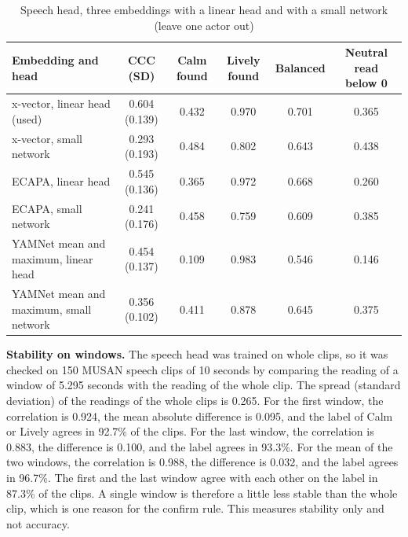 \begin{table}[htbp]
    \centering
    \caption{Speech head, three embeddings with a linear head and with a small network (leave one actor out)}\label{tab:ai-speechres}
    \footnotesize
    \setlength{\tabcolsep}{3pt}
    \renewcommand{\arraystretch}{1.2}
    \begin{tabular}{|>{\raggedright\arraybackslash}p{}|c|c|c|c|c|}
        \hline
        \textbf{Embedding and head} & \textbf{CCC (SD)} & \textbf{Calm found} & \textbf{Lively found} & \textbf{Balanced} & \textbf{Neutral read below 0} \\
        \hline
        x-vector, linear head (used) & 0.604 (0.139) & 0.432 & 0.970 & 0.701 & 0.365 \\
        \hline
        x-vector, small network & 0.293 (0.193) & 0.484 & 0.802 & 0.643 & 0.438 \\
        \hline
        ECAPA, linear head & 0.545 (0.136) & 0.365 & 0.972 & 0.668 & 0.260 \\
        \hline
        ECAPA, small network & 0.241 (0.176) & 0.458 & 0.759 & 0.609 & 0.385 \\
        \hline
        YAMNet mean and maximum, linear head & 0.454 (0.137) & 0.109 & 0.983 & 0.546 & 0.146 \\
        \hline
        YAMNet mean and maximum, small network & 0.356 (0.102) & 0.411 & 0.878 & 0.645 & 0.375 \\
        \hline
    \end{tabular}
\end{table}

\textbf{Stability on windows.} The speech head was trained on whole clips, so it was checked on 150 MUSAN speech clips of 10 seconds by comparing the reading of a window of 5.295 seconds with the reading of the whole clip. The spread (standard deviation) of the readings of the whole clips is 0.265. For the first window, the correlation is 0.924, the mean absolute difference is 0.095, and the label of Calm or Lively agrees in 92.7\% of the clips. For the last window, the correlation is 0.883, the difference is 0.100, and the label agrees in 93.3\%. For the mean of the two windows, the correlation is 0.988, the difference is 0.032, and the label agrees in 96.7\%. The first and the last window agree with each other on the label in 87.3\% of the clips. A single window is therefore a little less stable than the whole clip, which is one reason for the confirm rule. This measures stability only and not accuracy.

